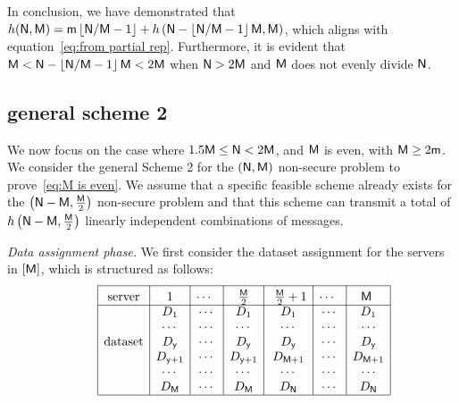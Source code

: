 \documentclass[conference,letterpaper]{IEEEtran}
\begin{document}
In conclusion, we have demonstrated that $h({\sf N}, {\sf M}) = {\sf m}\left\lfloor {\sf N}/{\sf M} - 1 \right\rfloor + h\left({\sf N} - \left\lfloor {\sf N}/{\sf M} - 1 \right\rfloor {\sf M}, {\sf M} \right)$, which aligns with equation~\eqref{eq:from partial rep}. 
Furthermore, it is evident that ${\sf M} < {\sf N} - \left\lfloor {\sf N}/{\sf M} - 1 \right\rfloor {\sf M} < 2{\sf M}$ when ${\sf N} > 2{\sf M}$ and ${\sf M}$ does not evenly divide ${\sf N}$.

\subsection{general scheme 2}
\label{general scheme 2}
We now focus on the case where $1.5 {\sf M} \leq {\sf N} < 2 {\sf M}$, and ${\sf M}$ is even, with ${\sf M} \geq 2{\sf m}$. We consider the general Scheme 2 for the $({\sf N}, {\sf M})$ non-secure problem to prove~\eqref{eq:M is even}. We assume that a specific feasible scheme already exists for the $\left({\sf N} - {\sf M}, \frac{{\sf M}}{2}\right)$ non-secure problem and that this scheme can transmit a total of $h\left({\sf N} - {\sf M}, \frac{{\sf M}}{2}\right)$ linearly independent combinations of messages.

{\it Data assignment phase.}
We first consider the dataset assignment for the servers in $[{\sf M}]$, which is structured as follows:
\begin{align*}
\begin{array}{rl|c|c|c|c|c|c|c|}\cline{3-3}\cline{4-4}\cline{5-5}\cline{6-6}\cline{7-7}\cline{8-8}\cline{9-9}
&&\rule{0pt}{1.2em}\mbox{server} & \rule{0pt}{1.2em}\mbox{1} &\rule{0pt}{1.2em}\mbox{$\cdots$ } &  \rule{0pt}{1.2em}\mbox{ $\frac{\Msf}{2}$ } & \rule{0pt}{1.2em}\mbox{ $\frac{\Msf}{2}  +1$}&  \rule{0pt}{1.2em}\mbox{$\cdots$ } &  \rule{0pt}{1.2em}\mbox{$\Msf$ }\\ 
\cline{3-3}\cline{4-4}\cline{5-5}\cline{6-6}\cline{7-7}\cline{8-8}\cline{9-9}
&& &D_1 & \cdots & D_1 & D_1 & \cdots & D_1 \\
&& &\cdots & \cdots & \cdots & \cdots & \cdots & \cdots \\ 
&& \mbox{dataset}&D_{\ysf} & \cdots & D_{\ysf} & D_{\ysf} & \cdots & D_{\ysf} \\
&& &D_{\ysf+1} & \cdots & D_{\ysf+1} & D_{\Msf+1} & \cdots & D_{\Msf+1} \\ 
&& &\cdots & \cdots & \cdots & \cdots & \cdots & \cdots \\
&& &D_{\Msf} & \cdots & D_{\Msf}&  D_{\Nsf} & \cdots & D_{\Nsf}\\  
\cline{3-3}\cline{4-4}\cline{5-5}\cline{6-6}\cline{7-7}\cline{8-8}\cline{9-9}
\end{array}
\end{align*}
\end{document}
